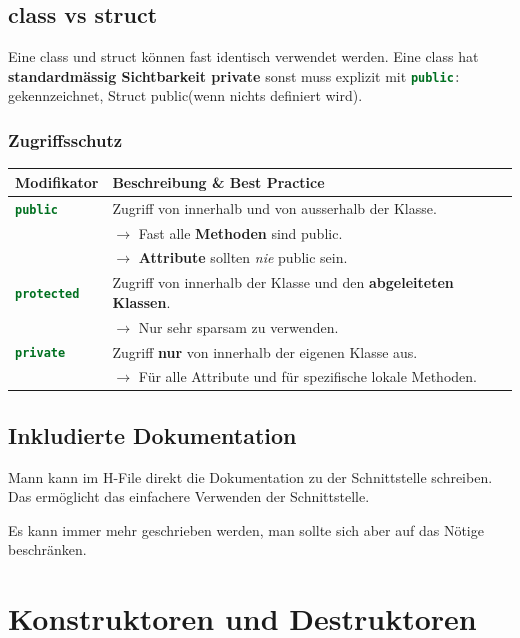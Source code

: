 \subsection{class vs struct}

Eine class und struct können fast identisch verwendet werden. 
Eine class hat \textbf{standardmässig Sichtbarkeit private} sonst muss explizit mit \lstinline[language=C++]|public:| gekennzeichnet, Struct public(wenn nichts definiert wird).

\subsubsection{Zugriffsschutz}
\begin{tabular}{|l|l|}
    \hline
    \textbf{Modifikator} & \textbf{Beschreibung \& Best Practice} \\ \hline
    \lstinline[language=C++]|public| & Zugriff von innerhalb und von ausserhalb der Klasse. \\ 
    & $\rightarrow$ Fast alle \textbf{Methoden} sind public. \\ 
    & $\rightarrow$ \textbf{Attribute} sollten \textit{nie} public sein. \\ \hline
    \lstinline[language=C++]|protected| & Zugriff von innerhalb der Klasse und den \textbf{abgeleiteten Klassen}. \\ 
    & $\rightarrow$ Nur sehr sparsam zu verwenden. \\ \hline
    \lstinline[language=C++]|private| & Zugriff \textbf{nur} von innerhalb der eigenen Klasse aus. \\ 
    & $\rightarrow$ Für alle Attribute und für spezifische lokale Methoden. \\ \hline
\end{tabular}

\subsection{Inkludierte Dokumentation}

Mann kann im H-File direkt die Dokumentation zu der Schnittstelle schreiben. 
Das ermöglicht das einfachere Verwenden der Schnittstelle.



Es kann immer mehr geschrieben werden, man sollte sich aber auf das Nötige beschränken.

\section{Konstruktoren und Destruktoren}

